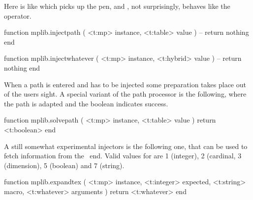 \stoptyping

Here  is like \type [option=MP] {&&} which picks up the
pen, and , not surprisingly, behaves like the  operator.

\starttyping[option=LUA]
function mplib.injectpath ( <t:mp> instance,  <t:table> value )
    -- return nothing
end
\stoptyping

\starttyping[option=LUA]
function mplib.injectwhatever ( <t:mp> instance, <t:hybrid> value )
    -- return nothing
end
\stoptyping

When a path is entered and has to be injected some preparation takes place out of
the users sight. A special variant of the path processor is the following, where
the path is adapted and the boolean indicates success.

\starttyping[option=LUA]
function mplib.solvepath ( <t:mp> instance, <t:table> value )
    return <t:boolean>
end
\stoptyping

A still somewhat experimental injectors is the following one, that can be used to
fetch information from the \TEX\ end. Valid values for  are 1
(integer), 2 (cardinal, 3 (dimension), 5 (boolean) and 7 (string).

\starttyping[option=LUA]
function mplib.expandtex (
    <t:mp>       instance,
    <t:integer>  expected,
    <t:string>   macro,
    <t:whatever> arguments
)
    return <t:whatever>
end
\stoptyping

\stopsection

\stopdocument
